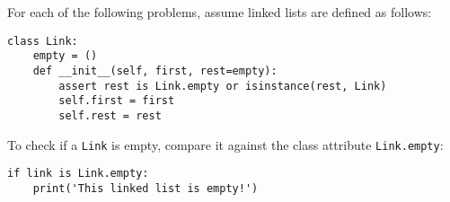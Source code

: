 \begin{blocksection}
For each of the following problems, assume linked lists are defined as follows:

\begin{lstlisting}
class Link:
    empty = ()
    def __init__(self, first, rest=empty):
        assert rest is Link.empty or isinstance(rest, Link)
        self.first = first
        self.rest = rest
\end{lstlisting}
\vspace{\baselineskip}
To check if a \texttt{Link} is empty, compare it against the class attribute \texttt{Link.empty}:

\begin{lstlisting}
if link is Link.empty:
    print('This linked list is empty!')
\end{lstlisting}
\end{blocksection}
